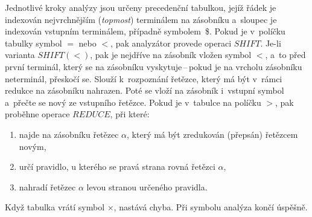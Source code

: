 Jednotlivé kroky analýzy jsou určeny precedenční tabulkou, jejíž řádek je indexován nejvrchnějším (\emph{topmost}) terminálem na zásobníku a~sloupec je indexován vstupním terminálem, případně symbolem~\$.
Pokud je v~políčku tabulky symbol $=$ nebo $<$, pak analyzátor provede operaci $SHIFT$.
Je-li varianta $SHIFT(<)$, pak je nejdříve na zásobník vložen symbol $<$, a~to před první terminál, který se na zásobníku vyskytuje\,--\,pokud je na vrcholu zásobníku neterminál, přeskočí se.
Slouží k~rozpoznání řetězce, který má být v~rámci redukce na zásobníku nahrazen.
Poté se vloží na zásobník i~vstupní symbol a~přečte se nový ze vstupního řetězce.
Pokud je v~tabulce na políčku $>$, pak proběhne operace $REDUCE$, při které:
\begin{enumerate}
    \item najde na zásobníku řetězec $\alpha$, který má být zredukován (přepsán) řetězcem novým,
    \item určí pravidlo, u kterého se pravá strana rovná řetězci $\alpha$,
    \item nahradí řetězec $\alpha$ levou stranou určeného pravidla.
\end{enumerate}
Když tabulka vrátí symbol $\times$, nastává chyba. 
Při symbolu \checkmark analýza končí úspěšně.

